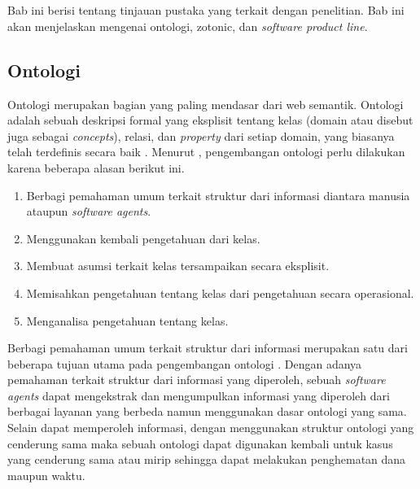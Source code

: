 \chapter{\babDua}
Bab ini berisi tentang tinjauan pustaka yang terkait dengan penelitian. Bab ini akan menjelaskan mengenai ontologi, zotonic, dan \textit{software product line}.
\section{Ontologi}
	
Ontologi merupakan bagian yang paling mendasar dari web semantik. Ontologi
adalah sebuah deskripsi formal yang eksplisit tentang kelas (domain atau disebut juga sebagai \textit{concepts}), relasi, dan \textit{property} dari setiap domain, yang biasanya telah terdefinis secara baik \citep{hopkins_powell_2015}. Menurut \cite{ontologydevelopment}, pengembangan ontologi perlu dilakukan karena beberapa alasan berikut ini.

\begin{enumerate}
\item Berbagi pemahaman umum terkait struktur dari informasi diantara manusia ataupun \textit{software agents}.
\item Menggunakan kembali pengetahuan dari kelas.
\item Membuat asumsi terkait kelas tersampaikan secara eksplisit.
\item Memisahkan pengetahuan tentang kelas dari pengetahuan secara operasional.
\item Menganalisa pengetahuan tentang kelas.
\end{enumerate}

Berbagi pemahaman umum terkait struktur dari informasi merupakan satu dari beberapa tujuan utama pada pengembangan ontologi \citep{paper.gruber}. Dengan adanya pemahaman terkait struktur dari informasi yang diperoleh, sebuah \textit{software agents} dapat mengekstrak dan mengumpulkan informasi yang diperoleh dari berbagai layanan yang berbeda namun menggunakan dasar ontologi yang sama. Selain dapat memperoleh informasi, dengan menggunakan struktur ontologi yang cenderung sama maka sebuah ontologi dapat digunakan kembali untuk kasus yang cenderung sama atau mirip sehingga dapat melakukan penghematan dana maupun waktu.


